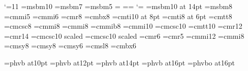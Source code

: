 \else   \catcode`\@=11
        \font\tenmsb=msbm10 \font\sevenmsb=msbm7 \font\fivemsb=msbm5
        \textfont\msbfam=\tenmsb
        \scriptfont\msbfam=\sevenmsb \scriptscriptfont\msbfam=\fivemsb
        \def\Bbb{\relax\expandafter\Bbb@}
        \def\Bbb@#1{{\Bbb@@{#1}}}
        \def\Bbb@@#1{\fam\msbfam\relax#1}
        \catcode`\@=\active
	\font\fourteenbbb=msbm10 at 14pt
	\font\eightbbb=msbm8
\fi
        \font\fivemi=cmmi5
        \font\sixmi=cmmi6
        \font\eightrm=cmr8              \def\xrm{\eightrm}
        \font\eightbf=cmbx8             \def\xbf{\eightbf}
        \font\eightit=cmti10 at 8pt     \def\xit{\eightit}
        \font\sixit=cmti8 at 6pt        \def\xxit{\sixit}
        \font\eighttt=cmtt8             \def\xtt{\eighttt}
        \font\eightcp=cmcsc8
        \font\eighti=cmmi8              \def\xold{\eighti}
        \font\eightmi=cmmi8
        \font\eightib=cmmib8             \def\xbold{\eightib}
        \font\teni=cmmi10               \def\old{\teni}
        \font\tencp=cmcsc10
        \font\tentt=cmtt10
        \font\twelverm=cmr12
        \font\fourteenrm=cmr14
        \font\twelvecp=cmcsc10 scaled
        \font\fourteencp=cmcsc10 scaled
        \font\sixrm=cmr6
        \font\fiverm=cmr5
        \font\twelvemath=cmmi12
        \font\eightmath=cmmi8
	\font\eightsym=cmsy8
        \font\eightsy=cmsy8
        \font\sixsy=cmsy6
        \font\eightsl=cmsl8
        \font\sixbf=cmbx6

	\font\tenhelvbold=phvb at10pt	\def\helvbold{\tenhelvbold}
	\font\twelvehelvbold=phvb at12pt
	\font\fourteenhelvbold=phvb at14pt
	\font\sixteenhelvbold=phvb at16pt
	\font\sixteenhelvboldit=phvbo at16pt

\def\noblackbox{\overfullrule=0pt}
\noblackbox

\def\eightpoint{
\def\rm{\fam0\eightrm}
\textfont0=\eightrm \scriptfont0=\sixrm \scriptscriptfont0=\fiverm
\textfont1=\eightmi  \scriptfont1=\sixmi  \scriptscriptfont1=\fivemi
\textfont2=\eightsy \scriptfont2=\sixsy \scriptscriptfont2=\fivesy
\textfont3=\tenex   \scriptfont3=\tenex \scriptscriptfont3=\tenex
\textfont\itfam=\eightit \def\it{\fam\itfam\eightit}
\textfont\slfam=\eightsl \def\sl{\fam\slfam\eightsl}
\textfont\ttfam=\eighttt \def\tt{\fam\ttfam\eighttt}
\textfont\bffam=\eightbf \scriptfont\bffam=\sixbf 
                         \scriptscriptfont\bffam=\fivebf
                         \def\bf{\fam\bffam\eightbf}
\normalbaselineskip=10pt}

